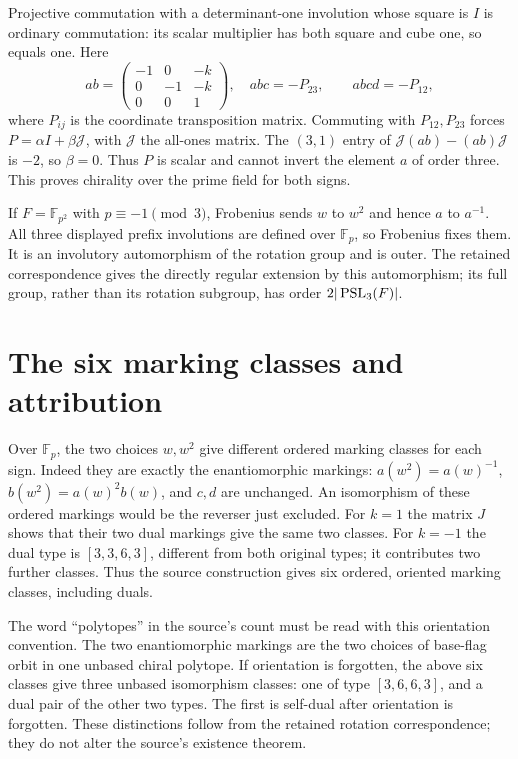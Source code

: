 \documentclass[11pt,a4paper]{article}
\newcommand{\Fp}{\mathbb F_p}\newcommand{\PG}{\operatorname{PG}}
\begin{document}
Projective commutation with a determinant-one involution whose square is
$I$ is ordinary commutation: its scalar multiplier has both square and
cube one, so equals one. Here
\[
 ab=\begin{pmatrix}-1&0&-k\\0&-1&-k\\0&0&1\end{pmatrix},\quad
 abc=-P_{23},\qquad abcd=-P_{12},
\]
where $P_{ij}$ is the coordinate transposition matrix. Commuting with
$P_{12},P_{23}$ forces $P=\alpha I+\beta\mathcal J$, with
$\mathcal J$ the all-ones matrix. The $(3,1)$ entry of
$\mathcal J(ab)-(ab)\mathcal J$ is $-2$, so $\beta=0$.
Thus $P$ is scalar and cannot invert the element $a$ of order three.
This proves chirality over the prime field for both signs.

If $F=\mathbb F_{p^2}$ with $p\equiv-1\pmod3$, Frobenius sends
$w$ to $w^2$ and hence $a$ to $a^{-1}$. All three displayed prefix
involutions are defined over $\Fp$, so Frobenius fixes them. It is an
involutory automorphism of the rotation group and is outer. The retained
correspondence gives the directly regular extension by this automorphism;
its full group, rather than its rotation subgroup, has order
$2|\operatorname{PSL}_3(F)|$.

\section{The six marking classes and attribution}
Over $\Fp$, the two choices $w,w^2$ give different ordered marking
classes for each sign. Indeed they are exactly the enantiomorphic
markings: $a(w^2)=a(w)^{-1}$, $b(w^2)=a(w)^2b(w)$, and $c,d$ are
unchanged. An isomorphism of these ordered markings would be the
reverser just excluded. For $k=1$ the matrix $J$ shows that their two
dual markings give the same two classes. For $k=-1$ the dual type is
$[3,3,6,3]$, different from both original types; it contributes two
further classes. Thus the source construction gives six ordered,
oriented marking classes, including duals.

The word ``polytopes'' in the source's count must be read with this
orientation convention. The two enantiomorphic markings are the two
choices of base-flag orbit in one unbased chiral polytope. If orientation
is forgotten, the above six classes give three unbased isomorphism
classes: one of type $[3,6,6,3]$, and a dual pair of the other two types.
The first is self-dual after orientation is forgotten. These distinctions
follow from the retained rotation correspondence; they do not alter
the source's existence theorem.
\end{document}
